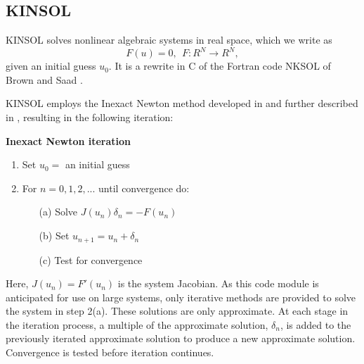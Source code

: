 \subsection{KINSOL}\label{ss:kinsol}

KINSOL solves nonlinear algebraic systems in real space, which we write as
\begin{equation}
F(u) = 0,~~ F:R^N \rightarrow R^N, 
\label{nonlinear_system}
\end{equation}
given an initial guess $u_0$.  It is a rewrite in C of the Fortran
code NKSOL of Brown and Saad \cite{BrSa:90}.

KINSOL employs the Inexact Newton method developed in 
\cite{BrSa:90,Bro:87,DES:82} 
and further described in \cite{DeSc:96,Kel:95}, 
resulting in the following iteration:

\vspace{0.2in}
{\bf Inexact Newton iteration}
\begin{enumerate}
   \item Set $u_0 = $ an initial guess
   \item For $n = 0, 1, 2,...$ until convergence do:\nonumber 
      \begin{itemize}
          \item[(a)] Solve $J(u_n)\delta_n = - F(u_n)$ 
          \item[(b)] Set $u_{n+1} = u_n + \delta_n$
          \item[(c)] Test for convergence
      \end{itemize}
\end{enumerate}
Here, $J(u_n) = F'(u_n)$ is the system Jacobian. As this code module is
anticipated for use on large systems, only iterative methods are provided 
to solve the system in step 2(a). These solutions are only approximate. 
At each stage in the iteration process, a multiple of the 
approximate solution, $\delta_n$, is added 
to the previously iterated approximate solution to produce a new 
approximate solution. Convergence is tested before iteration continues. 

